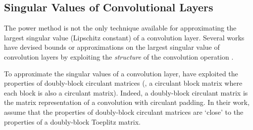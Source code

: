 \subsection{Singular Values of Convolutional Layers}
\label{subsection:ch3-singular_values_of_convolutional_layers}

The power method is not the only technique available for approximating the largest singular value (Lipschitz constant) of a convolution layer.
Several works have devised bounds or approximations on the largest singular value of convolution layers by exploiting the \emph{structure} of the convolution operation \cite{sedghi2018singular,bibi2019deep,singla2019bounding,jia2017improving}.

%


To approximate the singular values of a convolution layer, \citet{sedghi2018singular} have exploited the properties of doubly-block circulant matrices (\ie, a circulant block matrix where each block is also a circulant matrix).
Indeed, a doubly-block circulant matrix is the matrix representation of a convolution with circulant padding.
In their work, \citet{sedghi2018singular} assume that the properties of doubly-block circulant matrices are `close' to the properties of a doubly-block Toeplitz matrix.

